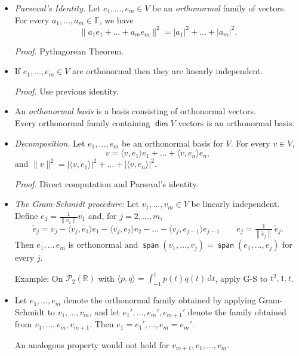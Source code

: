 \documentclass[11pt]{article}
\newcommand{\1}{\mathbf{1}}
\newcommand{\inner}[2]{\langle #1, #2 \rangle}
\newcommand{\dd}{{\mathrm{d}}}
\newcommand{\0}{\mathbf{0}}
\newcommand{\R}{\mathbb{R}}
\newcommand{\cP}{\mathcal{P}}
\DeclareMathOperator{\myspan}{\mathsf{span}}
\DeclareMathOperator{\mydim}{\mathsf{dim}}
\newcommand{\spitem}{\item[$\circ$]}
\begin{document}
{\begin{itemize}
\spitem

\emph{Parseval's Identity.}
Let $e_1,\dots,e_m\in V$ be an \emph{orthonormal} family of vectors.
\\
For every $a_1,\dots,a_m\in\mathbb{F}$, we have
\[
\|a_1e_1+\dots+a_me_m\|^2=|a_1|^2+\dots+|a_m|^2.
\]

\emph{Proof.}
Pythagorean Theorem.

\item
If $e_1,\dots,e_m\in V$ are orthonormal then they are linearly independent.

\emph{Proof.}
Use previous identity.

\item

An \emph{orthonormal basis} is a basis consisting of orthonormal vectors.
\\
Every orthonormal family containing $\mydim V$ vectors is an orthonormal basis.

\item
\emph{Decomposition.}
Let $e_1,\dots,e_m$ be an orthonormal basis for $V$.
For every $v\in V$,
\[
v=\langle v,e_1\rangle e_1+\dots+\langle v,e_n\rangle e_n,
\]
and $\|v\|^2=|\langle v,e_1\rangle|^2+\dots+|\langle v,e_n\rangle|^2$.

\emph{Proof.}
Direct computation and Parseval's identity.

\item

\emph{The Gram-Schmidt procedure:} Let $v_1,\dots,v_m\in V$ be linearly independent.
Define $e_1=\frac{1}{\|v_1\|} v_1$ and, for $j = 2,\dots,m$,
\[
\tilde{e}_j = v_j-\displaystyle{\langle v_j,e_1\rangle e_1} - \inner{v_j}{e_2}e_2 - \dots - \inner{v_j}{e_{j-1}}e_{j-1}
\qquad
e_j = \tfrac{1}{\left\|\tilde{e}_j\right\|} \, \tilde{e}_j.
\]
Then $e_1,\dots\,e_m$ is orthonormal and $\myspan(v_1,\dots,v_j)=\myspan(e_1,\dots,e_j)$ for every $j$.


Example:
On $\cP_2(\R)$ with $\inner{p}{q} = \int_{-1}^{1}p(t)q(t) \, \dd t$, apply G-S to $t^2,1,t$.

\spitem
Let $e_1,\dots,e_m$ denote the orthonormal family obtained by applying Gram-Schmidt to $v_1,\dots,v_m$, and let $e_1',\dots,e_m',e_{m+1}'$ denote the family obtained from $v_1,\dots,v_m,v_{m+1}$. Then $e_1=e_1',\dots,e_m=e_m'$.

An analogous property would not hold for $v_{m+1},v_1,\dots,v_m$.


\end{itemize}}
\end{document}
